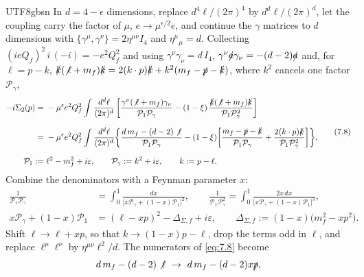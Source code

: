 \documentclass[11pt,a4paper,oneside]{report}
\begin{document}
\begin{CJK*}{UTF8}{gbsn}
In $d=4-\epsilon$ dimensions, replace $d^4\ell/(2\pi)^4$ by $d^d\ell/(2\pi)^d$, let the coupling carry the factor of $\mu$, $e\to\mu^{\epsilon/2}e$, and continue the $\gamma$ matrices to $d$ dimensions with $\{\gamma^\mu,\gamma^\nu\}=2\eta^{\mu\nu}I_4$ and $\eta^\mu{}_\mu=d$. Collecting $(ieQ_f)^2\,i\,(-i)=-e^2Q_f^2$ and using $\gamma^\nu\gamma_\nu=d\,I_4$, $\gamma^\nu\slashed{a}\gamma_\nu=-(d-2)\slashed{a}$ and, for $\ell=p-k$, $\slashed{k}(\not\ell+m_f)\slashed{k}=2(k\cdot p)\slashed{k}+k^2(m_f-\slashed{p}-\slashed{k})$, where $k^2$ cancels one factor $\mathcal P_\gamma$,
\begin{equation*}
\begin{aligned}
-i\Sigma_2(p)
={}&-\mu^{\epsilon}e^2Q_f^2\int\frac{d^d\ell}{(2\pi)^d}\left[
\frac{\gamma^\nu(\not\ell+m_f)\gamma_\nu}{\mathcal P_1\mathcal P_\gamma}
-(1-\xi)\,\frac{\slashed{k}(\not\ell+m_f)\slashed{k}}{\mathcal P_1\mathcal P_\gamma^2}\right]\\[6pt]
={}&-\mu^{\epsilon}e^2Q_f^2\int\frac{d^d\ell}{(2\pi)^d}\biggl\{
\frac{d\,m_f-(d-2)\not\ell}{\mathcal P_1\mathcal P_\gamma}
-(1-\xi)\biggl[\frac{m_f-\slashed{p}-\slashed{k}}{\mathcal P_1\mathcal P_\gamma}
+\frac{2(k\cdot p)\slashed{k}}{\mathcal P_1\mathcal P_\gamma^2}\biggr]\biggr\},\\[6pt]
\mathcal P_1:={}&\ell^2-m_f^2+i\varepsilon,\qquad
\mathcal P_\gamma:=k^2+i\varepsilon,\qquad
k:=p-\ell .
\end{aligned}
\tag{7.8}\label{eq:7.8}
\end{equation*}
Combine the denominators with a Feynman parameter $x$:
\begin{equation*}
\begin{aligned}
\frac{1}{\mathcal P_1\mathcal P_\gamma}
&=\int_0^1\frac{dx}{\bigl[x\mathcal P_\gamma+(1-x)\mathcal P_1\bigr]^2},\qquad
\frac{1}{\mathcal P_1\mathcal P_\gamma^2}
=\int_0^1\frac{2x\,dx}{\bigl[x\mathcal P_\gamma+(1-x)\mathcal P_1\bigr]^3},\\[6pt]
x\mathcal P_\gamma+(1-x)\mathcal P_1
&=(\ell-xp)^2-\Delta_{\Sigma,f}+i\varepsilon,\qquad
\Delta_{\Sigma,f}:=(1-x)\bigl(m_f^2-xp^2\bigr).
\end{aligned}
\tag{7.9}\label{eq:7.9}
\end{equation*}
Shift $\ell\to\ell+xp$, so that $k\to(1-x)p-\ell$, drop the terms odd in $\ell$, and replace $\ell^\mu\ell^\nu$ by $\eta^{\mu\nu}\ell^2/d$. The numerators of \eqref{eq:7.8} become
\begin{equation*}
\begin{aligned}
d\,m_f-(d-2)\not\ell\ &\to\ d\,m_f-(d-2)x\slashed{p},\\[4pt]

\end{aligned}
\end{equation*}
\end{CJK*}
\end{document}
